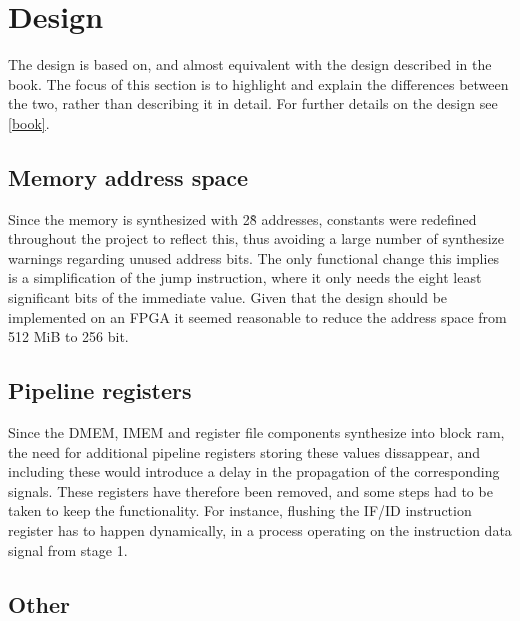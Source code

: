 \section{Design}
The design is based on, and almost equivalent with the design described in the book. The focus of this section is to highlight and explain the differences between the two, rather than describing it in detail. For further details on the design see \ref{book}.
\subsection{Memory address space}
Since the memory is synthesized with 2\^8 addresses, constants were redefined throughout the project to reflect this, thus avoiding a large number of synthesize warnings regarding unused address bits. The only functional change this implies is a simplification of the jump instruction, where it only needs the eight least significant bits of the immediate value. Given that the design should be implemented on an FPGA it seemed reasonable to reduce the address space from 512 MiB to 256 bit.

\subsection{Pipeline registers}
Since the DMEM, IMEM and register file components synthesize into block ram, the need for additional pipeline registers storing these values dissappear, and including these would introduce a delay in the propagation of the corresponding signals. These registers have therefore been removed, and some steps had to be taken to keep the functionality. For instance, flushing the IF/ID instruction register has to happen dynamically, in a process operating on the instruction data signal from stage 1.

\subsection{Other}